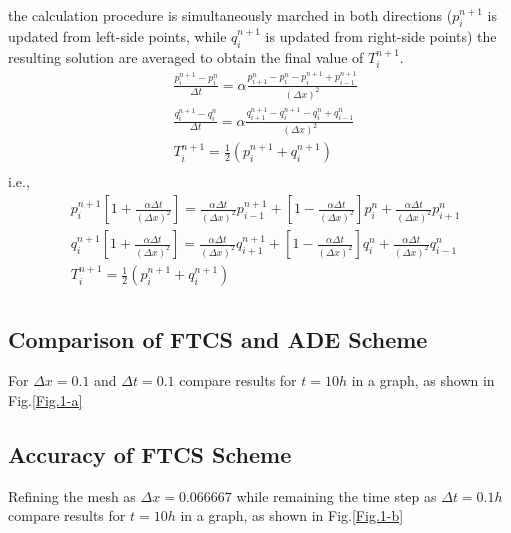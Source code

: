 \documentclass[12pt,a4paper]{article} %
\begin{document}
\begin{CJK}{UTF8}{song}
\begin{enumerate}
the calculation procedure is simultaneously marched in both directions
($p_{i}^{n+1}$ is updated from left-side points, while $q_{i}^{n+1}$ is updated from right-side points)
the resulting solution are averaged to obtain the final value of $T_{i}^{n+1}$.
\begin{equation}
    \begin{split}
& \frac{p^{n+1}_{i}-p^{n}_{i}}{\Delta t}=\alpha \frac{p_{i+1}^{n}-p_{i}^{n}-p_{i}^{n+1}+p_{i-1}^{n+1}}{(\Delta x)^{2}} \\
& \frac{q^{n+1}_{i}-q^{n}_{i}}{\Delta t}=\alpha \frac{q_{i+1}^{n+1}-q_{i}^{n+1}-q_{i}^{n}+q_{i-1}^{n}}{(\Delta x)^{2}} \\
& T_{i}^{n+1} = \frac{1}{2}(p^{n+1}_{i}+q^{n+1}_{i}) \\
    \end{split}
\end{equation}
i.e.,
\begin{equation}
    \begin{split}
& p_{i}^{n+1}[1+\frac{\alpha \Delta t}{(\Delta x)^{2}}]=\frac{\alpha \Delta t}{(\Delta x)^{2}}p_{i-1}^{n+1}+[1-\frac{\alpha \Delta t}{(\Delta x)^{2}}]p_{i}^{n}+\frac{\alpha \Delta t}{(\Delta x)^{2}}p_{i+1}^{n} \\
& q_{i}^{n+1}[1+\frac{\alpha \Delta t}{(\Delta x)^{2}}]=\frac{\alpha \Delta t}{(\Delta x)^{2}}q_{i+1}^{n+1}+[1-\frac{\alpha \Delta t}{(\Delta x)^{2}}]q_{i}^{n}+\frac{\alpha \Delta t}{(\Delta x)^{2}}q_{i-1}^{n} \\
& T_{i}^{n+1} = \frac{1}{2}(p^{n+1}_{i}+q^{n+1}_{i}) \\
    \end{split}
\end{equation}

\end{enumerate}

\subsection{Comparison of FTCS and ADE Scheme}
For $\Delta x=0.1$ and $\Delta t=0.1$ compare results for $t=10h$ in a graph, as shown in Fig.\ref{Fig.1-a}

\subsection{Accuracy of FTCS Scheme}

Refining the mesh as $\Delta x=0.066667$ while remaining the time step as $\Delta t=0.1h$ compare results for $t=10h$ in a graph, as shown in Fig.\ref{Fig.1-b}


\end{CJK}
\end{document}
